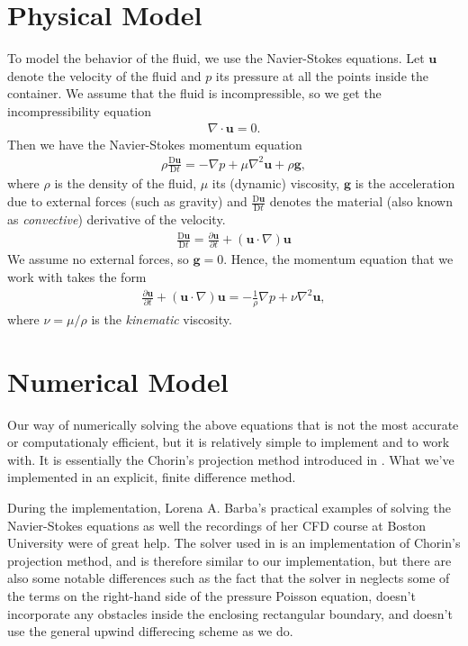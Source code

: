 \documentclass[11pt,a4paper,twoside,openright]{report}
\begin{document}
\section{Physical Model}
To model the behavior of the fluid, we use the Navier-Stokes equations. Let $\mathbf u$ denote the velocity of the fluid and $p$ its pressure at all the points inside the container. We assume that the fluid is incompressible, so we get the incompressibility equation
\newcommand{\uu}{\mathbf u}
\newcommand{\D}{\mathrm D}
\begin{align}\label{eq:incom}
	\nabla\cdot\uu=0.
\end{align}
Then we have the Navier-Stokes momentum equation
\newcommand{\conv}{\frac{\D\uu}{\D t}}
\begin{align*}
	\rho\conv=-\nabla p+\mu\nabla^2\uu+\rho\mathbf g,
\end{align*}
where $\rho$ is the density of the fluid, $\mu$ its (dynamic) viscosity, $\mathbf g$ is the acceleration due to external forces (such as gravity) and $\conv$ denotes the material (also known as \emph{convective}) derivative of the velocity.
\newcommand{\pder}[2]{\frac{\partial #1}{\partial #2}}
\begin{align*}
	\conv=\pder\uu t+(\uu\cdot\nabla)\uu
\end{align*}
We assume no external forces, so $\mathbf g=0$. Hence, the momentum equation that we work with takes the form
\begin{align}\label{eq:momentum}
	\pder\uu t+(\uu\cdot\nabla)\uu=-\frac1\rho\nabla p+\nu\nabla^2\uu,
\end{align}
where $\nu=\mu/\rho$ is the \emph{kinematic} viscosity.
\section{Numerical Model}
Our way of numerically solving the above equations that is not the most accurate or computationaly efficient, but it is relatively simple to implement and to work with. It is essentially the Chorin's projection method introduced in \cite{Chorin}. What we've implemented in an explicit, finite difference method.

During the implementation, Lorena A. Barba's practical examples of solving the Navier-Stokes equations \cite{CFDpython} as well the recordings of her CFD course at Boston University \cite{BarbaCourse} were of great help. The solver used in \cite{CFDpython} is an implementation of Chorin's projection method, and is therefore similar to our implementation, but there are also some notable differences such as the fact that the solver in \cite{CFDpython} neglects some of the terms on the right-hand side of the pressure Poisson equation, doesn't incorporate any obstacles inside the enclosing rectangular boundary, and doesn't use the general upwind differecing scheme as we do.
\end{document}
